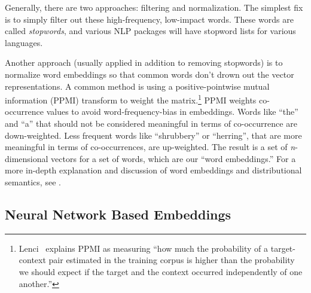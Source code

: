 Generally, there are two approaches: filtering and normalization. The simplest fix is to simply filter out these high-frequency, low-impact words. These words are called \emph{stopwords}, and various NLP packages will have stopword lists for various languages.

Another approach (usually applied in addition to removing stopwords) is to normalize word embeddings so that common words don't drown out the vector representations. A common method is using a positive-pointwise mutual information (PPMI) transform to weight the matrix.\footnote{Lenci~\cite{lenci2018distributional} explains PPMI as measuring ``how much the probability of a target-context pair estimated in the training corpus is higher than the probability we should expect if the target and the context occurred independently of one another.''} PPMI weights co-occurrence values to avoid word-frequency-bias in embeddings. Words like ``the'' and ``a'' that should not be considered meaningful in terms of co-occurrence are down-weighted. Less frequent words like ``shrubbery'' or ``herring'', that are more meaningful in terms of co-occurrences, are up-weighted. The result is a set of \textit{n}-dimensional vectors for a set of words, which are our ``word embeddings.'' For a more in-depth explanation and discussion of word embeddings and distributional semantics, see \cite{lenci2018distributional}.

\subsection{Neural Network Based Embeddings}

